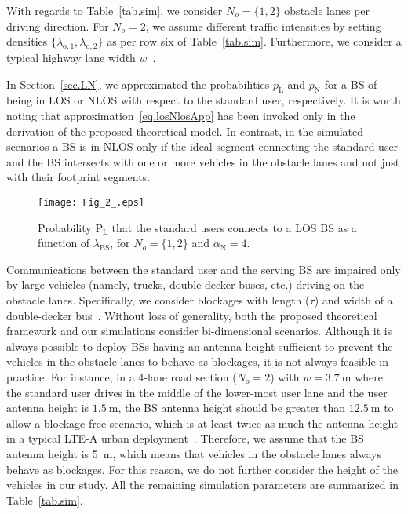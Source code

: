 \documentclass[10pt,journal,a4paper]{IEEEtran}
\begin{document}
With regards to Table~\ref{tab.sim}, we consider $N_o = \{1,2\}$ obstacle lanes per driving direction. For $N_o = 2$, we assume different traffic intensities by setting densities $\{\lambda_{\mathrm{o},1}, \lambda_{\mathrm{o},2}\}$ as per row six of Table~\ref{tab.sim}. Furthermore, we consider a typical highway lane width $w$~\cite{ioannou2013automated}.

In Section~\ref{sec.LN}, we approximated the probabilities $p_\mathrm{L}$ and $p_\mathrm{N}$ for a BS of being in LOS or NLOS with respect to the standard user, respectively. It is worth noting that approximation~\eqref{eq.losNlosApp} has been invoked only in the derivation of the proposed theoretical model. {In contrast, in the simulated scenarios a BS is in NLOS only if the ideal segment connecting the standard user and the BS intersects with one or more vehicles in the obstacle lanes and not just with their footprint segments.}

\begin{figure}[t]
\centering
\texttt{[image: Fig\_2\_.eps]}
\caption{Probability $\mathrm{P}_\mathrm{L}$ that the standard users connects to a LOS BS as a function of $\lambda_{\mathrm{BS}}$, for $N_o = \{1,2\}$ and $\alpha_\mathrm{N} = 4$.}
\label{fig.f_0}
\end{figure}

Communications between the standard user and the serving BS are impaired only by large vehicles (namely, trucks, double-decker buses, etc.) driving on the obstacle lanes. Specifically, we consider blockages with length ($\tau$) and width of a double-decker bus~\cite{routermaster}. Without loss of generality, both the proposed theoretical framework and our simulations consider bi-dimensional scenarios. Although it is always possible to deploy BSs having an antenna height sufficient to prevent the vehicles in the obstacle lanes to behave as blockages, it is not always feasible in practice. For instance, in a $4$-lane road section ($N_o = 2$) with $w = \SI{3.7}{\meter}$ where the standard user drives in the middle of the lower-most user lane and the user antenna height is $\SI{1.5}{\meter}$, the BS antenna height should be greater than $\SI{12.5}{\meter}$ to allow a blockage-free scenario, which is at least twice as much the antenna height in a typical LTE-A urban deployment~\cite{3gppAntenna}.
Therefore, we assume that the BS antenna height is \SI{5}{\meter}, which means that vehicles in the obstacle lanes always behave as blockages.
For this reason, we do not further consider the height of the vehicles in our study. All the remaining simulation parameters are summarized in Table~\ref{tab.sim}.
\end{document}
